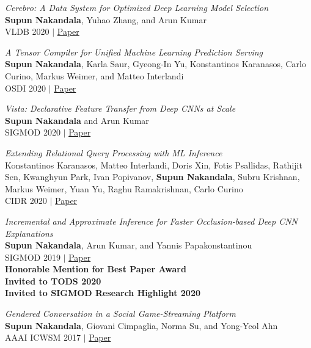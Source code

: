 \documentclass[margin]{res}
\begin{document}
\begin{resume}
\par
\textit{Cerebro: A Data System for Optimized Deep Learning Model Selection} \\
\textbf{Supun Nakandala}, Yuhao Zhang, and Arun Kumar\\
VLDB 2020 $|$ \href{https://adalabucsd.github.io/papers/2020_Cerebro_VLDB.pdf}{Paper}

\par
\textit{A Tensor Compiler for Unified Machine Learning Prediction Serving} \\
\textbf{Supun Nakandala}, Karla Saur, Gyeong-In Yu, Konstantinos Karanasos, Carlo Curino, Markus Weimer, and Matteo Interlandi\\
OSDI 2020 $|$ \href{https://www.usenix.org/conference/osdi20/presentation/nakandala}{Paper}

\par
\textit{Vista: Declarative Feature Transfer from Deep CNNs at Scale} \\
\textbf{Supun Nakandala} and Arun Kumar\\
SIGMOD 2020 $|$ \href{https://adalabucsd.github.io/papers/2020_Vista_SIGMOD.pdf}{Paper}

\par
\textit{Extending Relational Query Processing with ML Inference} \\
Konstantinos Karanasos, Matteo Interlandi, Doris Xin, Fotis Psallidas, Rathijit Sen, Kwanghyun Park, Ivan Popivanov, \textbf{Supun Nakandala}, Subru Krishnan, Markus Weimer, Yuan Yu, Raghu Ramakrishnan, Carlo Curino\\
CIDR 2020 $|$ \href{http://cidrdb.org/cidr2020/papers/p24-karanasos-cidr20.pdf}{Paper}

\par
\textit{Incremental and Approximate Inference for Faster Occlusion-based Deep CNN Explanations} \\
\textbf{Supun Nakandala}, Arun Kumar, and Yannis Papakonstantinou \\
SIGMOD 2019 $|$ \href{https://adalabucsd.github.io/papers/2019_Krypton_SIGMOD.pdf}{Paper}\\
\textbf{Honorable Mention for Best Paper Award\\ Invited to TODS 2020\\ Invited to SIGMOD Research Highlight 2020}

\par
\textit{Gendered Conversation in a Social Game-Streaming Platform} \\
\textbf{Supun Nakandala}, Giovani Cimpaglia, Norma Su, and Yong-Yeol Ahn \\
AAAI ICWSM 2017 $|$ \href{https://yongyeol.com/papers/nakandala2017twitch.pdf}{Paper}


\end{resume}
\end{document}
